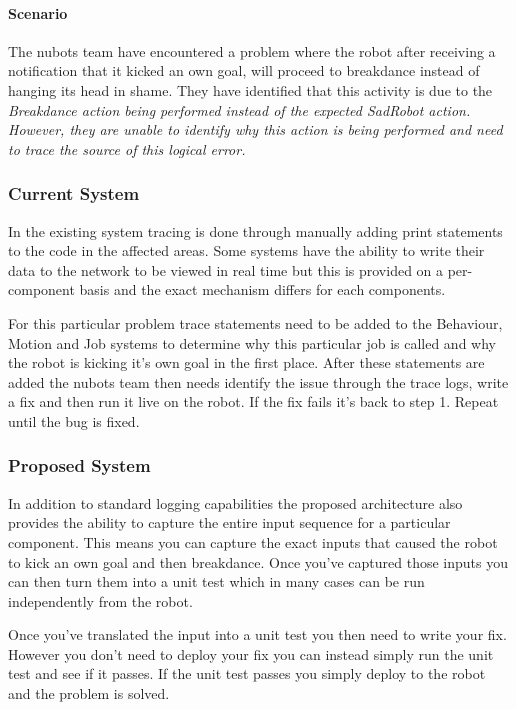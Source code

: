 \documentclass[english,12pt]{scrartcl}
\begin{document}
			\paragraph{Scenario} The \gls{nubots} team have encountered a problem where the robot after
			receiving a notification that it kicked an own goal, will proceed to breakdance instead
			of hanging its head in shame. They have identified that this activity is due to the
			\em{Breakdance} action being performed instead of the expected \em{SadRobot} action. However, they are unable to identify why this action is being performed and need to trace the source
			of this logical error.

			\subsubsection{Current System}
				In the existing system tracing is done through manually adding print statements to the code in the 
				affected areas. Some systems have the ability to write their data to the network to be viewed in real
				time but this is provided on a per-component basis and the exact mechanism differs for each components.
				
				For this particular problem trace statements need to be added to the Behaviour, Motion and Job systems to determine
				why this particular job is called and why the robot is kicking it's own goal in the first place. After these statements are added
				the \gls{nubots} team then needs identify the issue through the trace logs, write a fix and then run it live on the robot. If the 
				fix fails it's back to step 1. Repeat until the bug is fixed.
			\subsubsection{Proposed System}
				In addition to standard logging capabilities the proposed architecture also provides the ability to capture
				the entire input sequence for a particular component. This means you can capture the exact inputs that
				caused the robot to kick an own goal and then breakdance. Once you've captured those inputs you can then
				turn them into a unit test which in many cases can be run independently from the robot. 
				
				Once you've translated the input into a unit test you then need to write your fix. However you don't
				need to deploy your fix you can instead simply run the unit test and see if it passes. If the unit test passes
				you simply deploy to the robot and the problem is solved.
				
\end{document}
